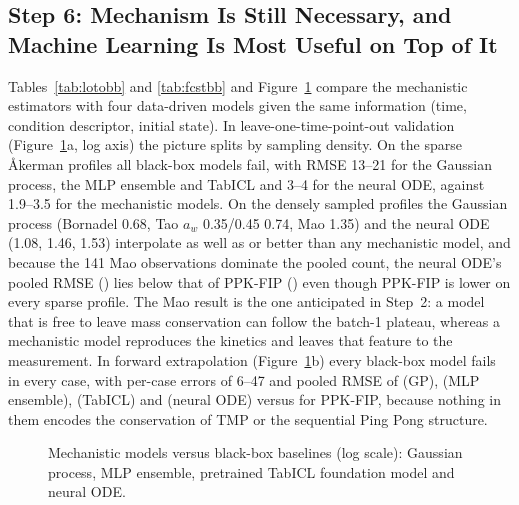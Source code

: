 \subsection{Step 6: Mechanism Is Still Necessary, and Machine Learning Is Most Useful on Top of It}
Tables~\ref{tab:lotobb} and \ref{tab:fcstbb} and Figure~\ref{fig:blackbox} compare the mechanistic estimators with four data-driven models given the same information (time, condition descriptor, initial state). In leave-one-time-point-out validation (Figure~\ref{fig:blackbox}a, log axis) the picture splits by sampling density. On the sparse Åkerman profiles all black-box models fail, with RMSE 13--21 for the Gaussian process, the MLP ensemble and TabICL and 3--4 for the neural ODE, against 1.9--3.5 for the mechanistic models. On the densely sampled profiles the Gaussian process (Bornadel 0.68, Tao $a_w$ 0.35/0.45 0.74, Mao 1.35) and the neural ODE (1.08, 1.46, 1.53) interpolate as well as or better than any mechanistic model, and because the 141 Mao observations dominate the pooled count, the neural ODE's pooled RMSE (\LotoBBNODE) lies below that of PPK-FIP (\LotoAllNew) even though PPK-FIP is lower on every sparse profile. The Mao result is the one anticipated in Step~2: a model that is free to leave mass conservation can follow the batch-1 plateau, whereas a mechanistic model reproduces the kinetics and leaves that feature to the measurement. In forward extrapolation (Figure~\ref{fig:blackbox}b) every black-box model fails in every case, with per-case errors of 6--47 and pooled RMSE of \FcstBBGP{} (GP), \FcstBBMLP{} (MLP ensemble), \FcstBBTabICL{} (TabICL) and \FcstBBNODE{} (neural ODE) versus \FcstAllNew{} for PPK-FIP, because nothing in them encodes the conservation of TMP or the sequential Ping Pong structure.
\begin{figure}[!htbp]\centering{}\caption{Mechanistic models versus black-box baselines (log scale): Gaussian process, MLP ensemble, pretrained TabICL foundation model and neural ODE.}\label{fig:blackbox}\end{figure}

